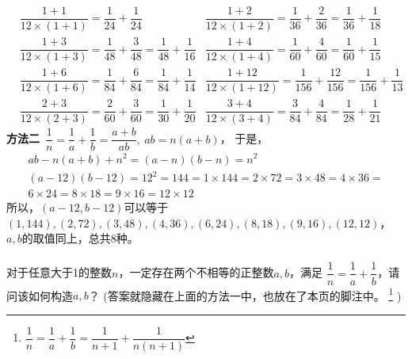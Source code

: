 \begin{enumerate}[label={【\textbf{例\thechapter.\arabic*}】},
 leftmargin=\inteval{\myenumleftmargin}pt,
 itemsep=\inteval{\myenumitempsep}pt,
 itemindent=\inteval{\myenumitemindent}pt]
\begin{align*}
    & \dfrac{1+1}{12\times(1+1)}=\dfrac{1}{24}+\dfrac{1}{24} 
    & \dfrac{1+2}{12\times(1+2)}=\dfrac{1}{36}+\dfrac{2}{36}=\dfrac{1}{36}+\dfrac{1}{18}\\
    & \dfrac{1+3}{12\times(1+3)}=\dfrac{1}{48}+\dfrac{3}{48}=\dfrac{1}{48}+\dfrac{1}{16} 
    & \dfrac{1+4}{12\times(1+4)}=\dfrac{1}{60}+\dfrac{4}{60}=\dfrac{1}{60}+\dfrac{1}{15} \\
    & \dfrac{1+6}{12\times(1+6)}=\dfrac{1}{84}+\dfrac{6}{84}=\dfrac{1}{84}+\dfrac{1}{14} 
    & \dfrac{1+12}{12\times(1+12)}=\dfrac{1}{156}+\dfrac{12}{156}=
    \dfrac{1}{156}+\dfrac{1}{13} \\
    & \dfrac{2+3}{12\times(2+3)}=\dfrac{2}{60}+\dfrac{3}{60}=\dfrac{1}{30}+\dfrac{1}{20} 
    & \dfrac{3+4}{12\times(3+4)}=\dfrac{3}{84}+\dfrac{4}{84}=\dfrac{1}{28}+\dfrac{1}{21} 
\end{align*}
\textbf{方法二}\ $ \dfrac{1}{n}=\dfrac{1}{a}+\dfrac{1}{b}=\dfrac{a+b}{ab},\ ab=n(a+b) $，
于是，
\begin{gather*}
    ab-n(a+b)+n^2=(a-n)(b-n)=n^2 \\
    (a-12)(b-12)=12^2=144=1\times144=2\times72=3\times48=4\times36=\\
    6\times24= 8\times18=9\times16=12\times12
\end{gather*}
所以，$ (a-12,b-12) $可以等于$ (1,144),(2,72),(3,48),(4,36),(6,24),(8,18),(9,16),
(12,12) $，$ a,b $的取值同上，总共8种。\\
\\
对于任意大于1的整数$ n $，一定存在两个不相等的正整数$ a,b $，满足
$ \dfrac{1}{n}=\dfrac{1}{a}+\dfrac{1}{b} $，请问该如何构造$ a,b $？
(答案就隐藏在上面的方法一中，也放在了本页的脚注中。
\footnote{$ \dfrac{1}{n}=\dfrac{1}{a}+\dfrac{1}{b}=
    \dfrac{1}{n+1}+\dfrac{1}{n(n+1)} $} )


\end{enumerate}
